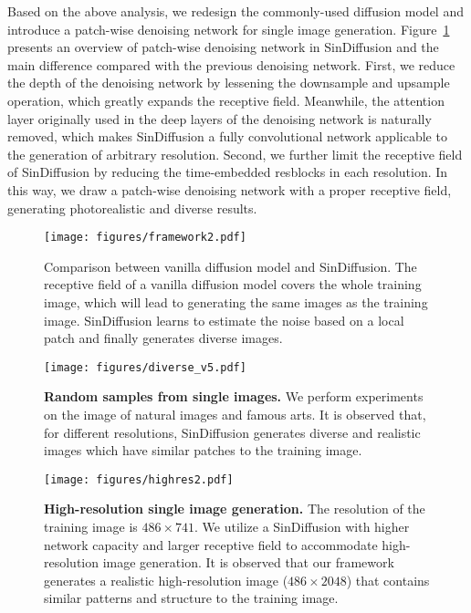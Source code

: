\documentclass[10pt,twocolumn,letterpaper]{article}
\begin{document}
Based on the above analysis, we redesign the commonly-used diffusion model and introduce a patch-wise denoising network for single image generation.
Figure~\ref{fig:framework2} presents an overview of patch-wise denoising network in SinDiffusion and the main difference compared with the previous denoising network.
First, we reduce the depth of the denoising network by lessening the downsample and upsample operation, which greatly expands the receptive field.
Meanwhile, the attention layer originally used in the deep layers of the denoising network is naturally removed, which makes SinDiffusion a fully convolutional network applicable to the generation of arbitrary resolution.
Second, we further limit the receptive field of SinDiffusion by reducing the time-embedded resblocks in each resolution.
In this way, we draw a patch-wise denoising network with a proper receptive field, generating photorealistic and diverse results.

\begin{figure}[t]
  \centering
   \texttt{[image: figures/framework2.pdf]}
   \vspace{-6mm}
   \caption{
   Comparison between vanilla diffusion model and SinDiffusion.
   The receptive field of a vanilla diffusion model covers the whole training image, which will lead to generating the same images as the training image.
   SinDiffusion learns to estimate the noise based on a local patch and finally generates diverse images.
   }
   \vspace{-4mm}
   \label{fig:framework2}
\end{figure}

\begin{figure*}[t]
  \centering
   \texttt{[image: figures/diverse\_v5.pdf]}
   \vspace{-7mm}
   \caption{
   \textbf{Random samples from single images.}
   We perform experiments on the image of natural images and famous arts.
   It is observed that, for different resolutions, SinDiffusion generates diverse and realistic images which have similar patches to the training image. 
   }
   \vspace{-4mm}
   \label{fig:diverse}
\end{figure*}

\begin{figure*}[t]
  \centering
   \texttt{[image: figures/highres2.pdf]}
   \vspace{-7mm}
   \caption{
   \textbf{High-resolution single image generation.}
   The resolution of the training image is $486 \times 741$.
   We utilize a SinDiffusion with higher network capacity and larger receptive field to accommodate high-resolution image generation.
   It is observed that our framework generates a realistic high-resolution image ($486 \times 2048$) that contains similar patterns and structure to the training image.
   }
   \vspace{-5mm}
   \label{fig:highres}
\end{figure*}
\end{document}
